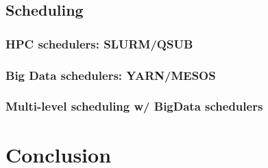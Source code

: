\documentclass{report}
\begin{document}
    \section{Scheduling} \subsection{HPC schedulers: SLURM/QSUB} \subsection{Big
    Data schedulers: YARN/MESOS} \subsection{Multi-level scheduling w/ BigData
    schedulers} \chapter{Conclusion}




\end{document}
